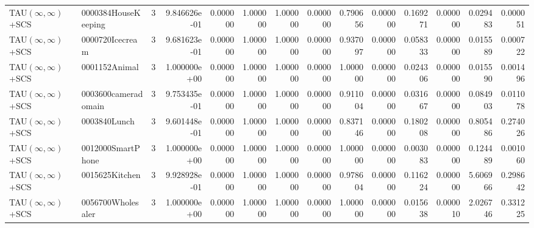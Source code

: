 \begin{tabular}{llrr|r|rr|rr|rr|rrr}
TAU$(\infty, \infty)$+SCS &    0000384HouseKeeping &       3 & 9.846626e-01 & 0.000000 & 1.000000 &      1.000000 & 0.000000 &      0.790656 & 0.000000 &      0.169271 &    0.000000 &     0.029483 &    0.000051 \\
TAU$(\infty, \infty)$+SCS &        0000720Icecream &       3 & 9.681623e-01 & 0.000000 & 1.000000 &      1.000000 & 0.000000 &      0.937097 & 0.000000 &      0.058333 &    0.000000 &     0.015589 &    0.000722 \\
TAU$(\infty, \infty)$+SCS &          0001152Animal &       3 & 1.000000e+00 & 0.000000 & 1.000000 &      1.000000 & 0.000000 &      1.000000 & 0.000000 &      0.024306 &    0.000000 &     0.015590 &    0.001496 \\
TAU$(\infty, \infty)$+SCS &    0003600cameradomain &       3 & 9.753435e-01 & 0.000000 & 1.000000 &      1.000000 & 0.000000 &      0.911004 & 0.000000 &      0.031667 &    0.000000 &     0.084903 &    0.011078 \\
TAU$(\infty, \infty)$+SCS &           0003840Lunch &       3 & 9.601448e-01 & 0.000000 & 1.000000 &      1.000000 & 0.000000 &      0.837146 & 0.000000 &      0.180208 &    0.000000 &     0.805486 &    0.274026 \\
TAU$(\infty, \infty)$+SCS &      0012000SmartPhone &       3 & 1.000000e+00 & 0.000000 & 1.000000 &      1.000000 & 0.000000 &      1.000000 & 0.000000 &      0.003083 &    0.000000 &     0.124489 &    0.001060 \\
TAU$(\infty, \infty)$+SCS &         0015625Kitchen &       3 & 9.928928e-01 & 0.000000 & 1.000000 &      1.000000 & 0.000000 &      0.978604 & 0.000000 &      0.116224 &    0.000000 &     5.606966 &    0.298642 \\
TAU$(\infty, \infty)$+SCS &      0056700Wholesaler &       3 & 1.000000e+00 & 0.000000 & 1.000000 &      1.000000 & 0.000000 &      1.000000 & 0.000000 &      0.015638 &    0.000010 &     2.026746 &    0.331225 \\
\bottomrule
\end{tabular}
